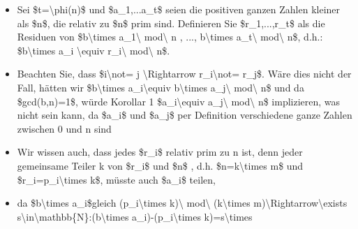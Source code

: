 \documentclass[a4paper]{article}
\begin{document}
\begin{multicols}{3}
\begin{itemize}
\begin{itemize}
                        \begin{itemize}
                            \item
                                  Sei \$t=\textbackslash phi(n)\$ und \$a\_1,...a\_t\$ seien die
                                  positiven ganzen Zahlen kleiner als \$n\$, die relativ zu \$n\$
                                  prim sind. Definieren Sie \$r\_1,...,r\_t\$ als die Residuen von
                                  \$b\textbackslash times a\_1\textbackslash{} mod\textbackslash{} n
                                  , ..., b\textbackslash times a\_t\textbackslash{}
                                  mod\textbackslash{} n\$, d.h.: \$b\textbackslash times a\_i
                                  \textbackslash equiv r\_i\textbackslash{} mod\textbackslash{} n\$.
                            \item
                                  Beachten Sie, dass \$i\textbackslash not= j
                                  \textbackslash Rightarrow r\_i\textbackslash not= r\_j\$. Wäre
                                  dies nicht der Fall, hätten wir \$b\textbackslash times
                                  a\_i\textbackslash equiv b\textbackslash times
                                  a\_j\textbackslash{} mod\textbackslash{} n\$ und da
                                  \$gcd(b,n)=1\$, würde Korollar 1 \$a\_i\textbackslash equiv
                                  a\_j\textbackslash{} mod\textbackslash{} n\$ implizieren, was
                                  nicht sein kann, da \$a\_i\$ und \$a\_j\$ per Definition
                                  verschiedene ganze Zahlen zwischen 0 und n sind
                            \item
                                  Wir wissen auch, dass jedes \$r\_i\$ relativ prim zu n ist, denn
                                  jeder gemeinsame Teiler k von \$r\_i\$ und \$n\$ , d.h.
                                  \$n=k\textbackslash times m\$ und \$r\_i=p\_i\textbackslash times
                                  k\$, müsste auch \$a\_i\$ teilen,
                            \item
                                  da \$b\textbackslash times a\_i\$gleich (p\_i\textbackslash times
                                  k)\textbackslash{} mod\textbackslash{} (k\textbackslash times
                                  m)\textbackslash Rightarrow\textbackslash exists
                                  s\textbackslash in\textbackslash mathbb\{N\}:(b\textbackslash times
                                  a\_i)-(p\_i\textbackslash times k)=s\textbackslash times

\end{itemize}
\end{itemize}
\end{itemize}
\end{multicols}
\end{document}

